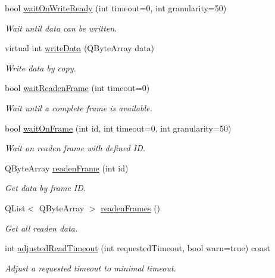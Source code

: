 \begin{DoxyCompactItemize}
bool \hyperlink{classmdt_port_manager_a1ca92c5ac120d87e5b10bff54ed1aa5c}{waitOnWriteReady} (int timeout=0, int granularity=50)
\begin{DoxyCompactList}\small\item\em Wait until data can be written. \end{DoxyCompactList}\item 
virtual int \hyperlink{classmdt_port_manager_a8b60d53d6e553f15dedec916f9c1614b}{writeData} (QByteArray data)
\begin{DoxyCompactList}\small\item\em Write data by copy. \end{DoxyCompactList}\item 
bool \hyperlink{classmdt_port_manager_ad87eff1f2dd54a165a78b34e30592901}{waitReadenFrame} (int timeout=0)
\begin{DoxyCompactList}\small\item\em Wait until a complete frame is available. \end{DoxyCompactList}\item 
bool \hyperlink{classmdt_port_manager_a680546498a0cd486c4fc16d28f44e4c6}{waitOnFrame} (int id, int timeout=0, int granularity=50)
\begin{DoxyCompactList}\small\item\em Wait on readen frame with defined ID. \end{DoxyCompactList}\item 
QByteArray \hyperlink{classmdt_port_manager_a830ae182d06dd6a52c43a7f45b9240ac}{readenFrame} (int id)
\begin{DoxyCompactList}\small\item\em Get data by frame ID. \end{DoxyCompactList}\item 
QList$<$ QByteArray $>$ \hyperlink{classmdt_port_manager_addd5dcae9644cea42a9871205af41796}{readenFrames} ()
\begin{DoxyCompactList}\small\item\em Get all readen data. \end{DoxyCompactList}\item 
int \hyperlink{classmdt_port_manager_a7cb3155940e23db0122d14f21fca858d}{adjustedReadTimeout} (int requestedTimeout, bool warn=true) const 
\begin{DoxyCompactList}\small\item\em Adjust a requested timeout to minimal timeout. \end{DoxyCompactList}\item 

\end{DoxyCompactItemize}

